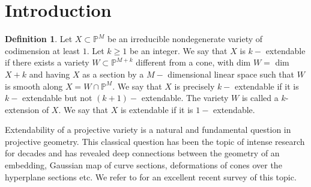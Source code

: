 \documentclass[11pt,twoside]{amsart}
\theoremstyle{plain}
\numberwithin{equation}{section}
\theoremstyle{definition}
\newtheorem{definition}[theorem]{Definition}
\begin{document}
    

\section{Introduction}

\begin{definition}\label{extendability}
Let $X \subset \mathbb{P}^M$ be an irreducible nondegenerate variety of codimension at least $1$. Let $k \geq 1$ be an integer. We say that $X$ is $k-$ extendable if there exists a variety $W \subset \mathbb{P}^{M+k}$
different from a cone, with dim $W =$ dim $X + k$ and having $X$ as a section by a $M-$ dimensional linear space such that $W$ is smooth along $X = W \cap \mathbb{P}^M$. We say that $X$ is precisely $k-$ extendable if it is $k-$ extendable but not $(k + 1)-$ extendable. The variety $W$ is called a $k$-extension of $X$. We say that $X$ is extendable if it is $1-$ extendable.  
\end{definition}

Extendability of a projective variety is a natural and fundamental question in projective geometry. This classical question has been the topic of intense research for decades and has revealed deep connections between the geometry of an embedding, Gaussian map of curve sections, deformations of cones over the hyperplane sections etc. We refer to \cite{Lop23} for an excellent recent survey of this topic. 

\smallskip
\end{document}
